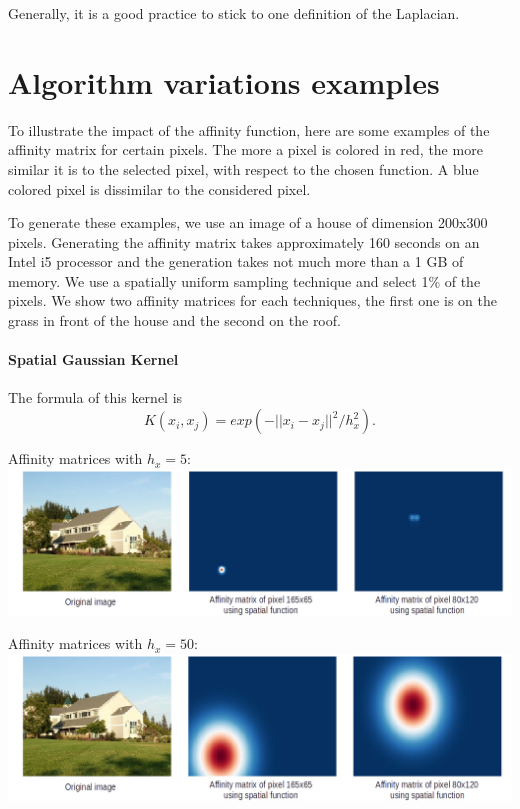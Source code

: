Generally, it is a good practice to stick to one definition of the Laplacian.

\section{Algorithm variations examples}

To illustrate the impact of the affinity function, here are some examples of the affinity matrix for certain pixels.
The more a pixel is colored in red, the more similar it is to the selected pixel, with respect to the chosen function.
A blue colored pixel is dissimilar to the considered pixel.

To generate these examples, we use an image of a house of dimension 200x300 pixels. Generating the affinity matrix takes approximately 160 seconds on an Intel i5 processor and the generation takes not much more than a 1 GB of memory. We use a spatially uniform sampling technique and select 1\% of the pixels. We show two affinity matrices for each techniques, the first one is on the grass in front of the house and the second on the roof.


\paragraph{Spatial Gaussian Kernel}
The formula of this kernel is
\[K(x_i, x_j) = exp(-||x_i - x_j||^2 / h_x^2).\]

Affinity matrices with \(h_x = 5\): \\
\includegraphics[width=\textwidth]{img/spatialAffinitySigma5.png}

Affinity matrices with \(h_x = 50\): \\
\includegraphics[width=\textwidth]{img/spatialAffinitySigma50.png}

